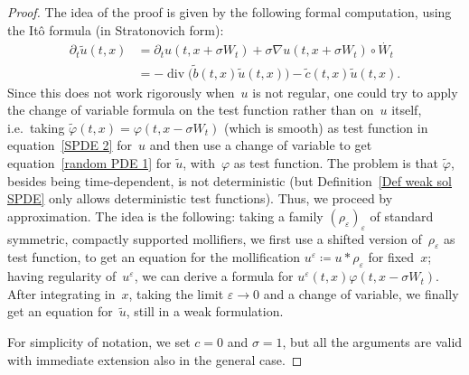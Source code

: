 \documentclass[a4paper,10pt]{article}
\newcommand\1{\mathbbm{1}}
\newcommand{\td}{\tilde}
\newcommand{\eps}{\varepsilon}
\DeclareMathOperator{\diverg}{div}
\numberwithin{equation}{section}
\begin{document}
\begin{proof}
The idea of the proof is given by the following formal computation, using the It\^o formula (in Stratonovich form):
\begin{align}
\partial_t\td{u}(t,x)& =\partial_t u(t,x+\sigma W_t)+ \sigma \nabla u(t,x+\sigma W_t)\circ\dot{W_t} \nonumber  \\
 & =-\diverg \big(\td{b}(t,x) \td{u}(t,x)\big)-\td{c}(t,x)\td{u}(t,x) .\label{formalequiv}
\end{align}
Since this does not work rigorously when~$u$ is not regular, one could try to apply the change of variable formula on the test function rather than on~$u$ itself, i.e.~taking $\td{\varphi}(t,x)=\varphi(t,x-\sigma W_t)$ (which is smooth) as test function in equation~\eqref{SPDE 2} for~$u$ and then use a change of variable to get equation~\eqref{random PDE 1} for $\td{u}$, with~$\varphi$ as test function. The problem is that $\td{\varphi}$, besides being time-dependent, is not deterministic (but Definition~\ref{Def weak sol SPDE} only allows deterministic test functions). Thus, we proceed by approximation. The idea is the following: taking a family $(\rho_\eps)_\eps$ of standard symmetric, compactly supported mollifiers, we first use a shifted version of~$\rho_\eps$ as test function, to get an equation for the mollification $u^\eps \coloneqq u*\rho_\eps$ for fixed~$x$; having regularity of~$u^\eps$, we can derive a formula for $u^\eps(t,x) \varphi(t,x- \sigma W_t)$. After integrating in~$x$, taking the limit $\varepsilon \to 0$ and a change of variable, we finally get an equation for~$\td{u}$, still in a weak formulation. 

For simplicity of notation, we set $c=0$ and $\sigma =1$, but all the arguments are valid with immediate extension also in the general case.


\end{proof}
\end{document}
